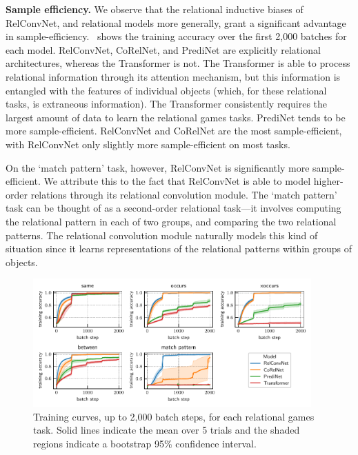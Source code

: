 \textbf{Sample efficiency.} We observe that the relational inductive biases of RelConvNet, and relational models more generally, grant a significant advantage in sample-efficiency.~ shows the training accuracy over the first 2,000 batches for each model. RelConvNet, CoRelNet, and PrediNet are explicitly relational architectures, whereas the Transformer is not. The Transformer is able to process relational information through its attention mechanism, but this information is entangled with the features of individual objects (which, for these relational tasks, is extraneous information). The Transformer consistently requires the largest amount of data to learn the relational games tasks. PrediNet tends to be more sample-efficient. RelConvNet and CoRelNet are the most sample-efficient, with RelConvNet only slightly more sample-efficient on most tasks.

On the `match pattern' task, however, RelConvNet is significantly more sample-efficient. We attribute this to the fact that RelConvNet is able to model higher-order relations through its relational convolution module. The `match pattern' task can be thought of as a second-order relational task---it involves computing the relational pattern in each of two groups, and comparing the two relational patterns. The relational convolution module naturally models this kind of situation since it learns representations of the relational patterns within groups of objects. %

\begin{figure}[t]
    \centering
    \includegraphics[width=0.95\textwidth]{figs/experiments/all_training_curves.pdf}
    \caption{Training curves, up to 2,000 batch steps, for each relational games task. Solid lines indicate the mean over 5 trials and the shaded regions indicate a bootstrap 95\% confidence interval.}\label{fig:training_curves}
\end{figure}

